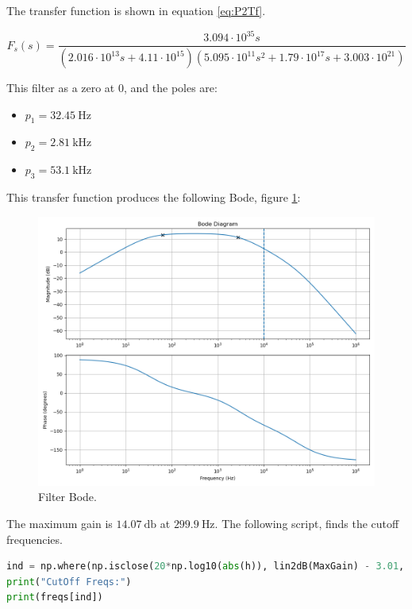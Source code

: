 The transfer function is shown in equation \ref{eq:P2Tf}.

\begin{equation}
    F_s(s) = \frac{3.094 \cdot 10^{35} s}{\left(2.016 \cdot 10^{13} s + 4.11 \cdot 10^{15}\right) \left(5.095 \cdot 10^{11}s^{2} + 1.79 \cdot 10^{17} s + 3.003 \cdot 10^{21}\right)}
    \label{eq:P2Tf}
\end{equation}

This filter as a zero at $0$, and the poles are:
\begin{itemize}
    \item $p_1 = \SI{32.45}{\hertz}$
    \item $p_2 = \SI{2.81}{\kilo\hertz}$
    \item $p_3 = \SI{53.1}{\kilo\hertz}$
\end{itemize}
This transfer function produces the following Bode, figure \ref{fig:P2BodePy}:

\begin{figure}[H]
    \centering
    \includegraphics*[scale = 0.4]{Images/P2BodePython.png}
    \caption{Filter Bode.}
    \label{fig:P2BodePy}
\end{figure}

The maximum gain is $\SI{14.07}{\decibel}$ at $\SI{299.9}{\hertz}$. The following script, finds the cutoff frequencies.

\begin{lstlisting}[language=python, caption = Cutt Off Frequencies]
ind = np.where(np.isclose(20*np.log10(abs(h)), lin2dB(MaxGain) - 3.01, atol=0.1))
print("CutOff Freqs:")
print(freqs[ind])
\end{lstlisting}

